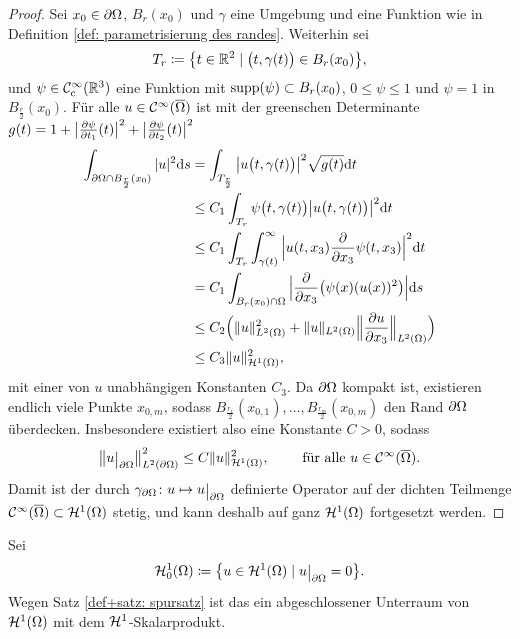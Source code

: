 \begin{proof}
	Sei \(x_0\in\partial\Omega\), \(B_r(x_0)\) und \(\gamma\) eine Umgebung und eine Funktion wie in Definition \ref{def: parametrisierung des randes}. Weiterhin sei
	\begin{equation*}
		T_r\coloneqq\big\{t\in\mathbb{R}^2\mid\big(t,\gamma(t)\big)\in B_r(x_0)\big\},
	\end{equation*}
	und \(\psi\in\mathcal{C}_{\mathrm{c}}^\infty(\mathbb{R}^3)\) eine Funktion mit \(\operatorname{supp}(\psi)\subset B_r(x_0)\), \(0\leq\psi\leq1\) und \(\psi=1\) in \(B_\frac{r}{2}(x_0)\). Für alle \(u\in\mathcal{C}^\infty(\overline{\Omega})\) ist mit der greenschen Determinante \(g(t)=1+\big|\frac{\partial\psi}{\partial t_1}(t)\big|^2+\big|\frac{\partial\psi}{\partial t_2}(t)\big|^2\)
	\begin{align*}
		\int_{\partial\Omega\cap B_\frac{r}{2}(x_0)}|u|^2\mathrm{d}s
		&=\int_{T_\frac{r}{2}}\big|u\big(t,\gamma(t)\big)\big|^2\sqrt{g(t)}\mathrm{d}t\\
		&\leq C_1\int_{T_r}\psi\big(t,\gamma(t)\big)\big|u\big(t,\gamma(t)\big)\big|^2\mathrm{d}t\\
		&\leq C_1\int_{T_r}\int_{\gamma(t)}^\infty\Big|u(t,x_3)\frac{\partial}{\partial x_3}\psi(t,x_3)\Big|^2\mathrm{d}t\\
		&=C_1\int_{B_r(x_0)\cap\Omega}\Big|\frac{\partial}{\partial x_3}\big(\psi(x)(u(x))^2\big)\Big|\mathrm{d}s\\
		&\leq C_2\Big(\|u\|_{L^2(\Omega)}^2+\|u\|_{L^2(\Omega)}\Big\|\frac{\partial u}{\partial x_3}\Big\|_{L^2(\Omega)}\Big)\\
		&\leq C_3\|u\|_{\mathcal{H}^1(\Omega)}^2,
	\end{align*}
	mit einer von \(u\) unabhängigen Konstanten \(C_3\). Da \(\partial\Omega\) kompakt ist, existieren endlich viele Punkte \(x_{0,m}\), sodass \(B_\frac{r_1}{2}(x_{0,1}),\ldots,B_\frac{r_m}{2}(x_{0,m})\) den Rand \(\partial\Omega\) überdecken. Insbesondere existiert also eine Konstante \(C>0\), sodass
	\begin{equation*}
		\big\|u\restrict{\p\Omega}\big\|_{L^2(\p\Omega)}^2\leq C\|u\|_{\H^1(\Omega)}^2,\qquad\te{ für alle }u\in\CC^\infty(\overline{\Omega}).
	\end{equation*}
	Damit ist der durch \(\gamma_{\p\Omega}\colon u\mapsto u\restrict{\p\Omega}\) definierte Operator auf der dichten Teilmenge \(\mathcal{C}^\infty(\overline{\Omega})\subset\mathcal{H}^1(\Omega)\) stetig, und kann deshalb auf ganz \(\mathcal{H}^1(\Omega)\) fortgesetzt werden.
\end{proof}
\begin{definition}
	Sei
	\begin{equation*}
		\H_0^1(\Omega)\coloneqq\big\{u\in\H^1(\Omega)\mid u\restrict{\p\Omega}=0\big\}.
	\end{equation*}
	Wegen Satz \ref{def+satz: spursatz} ist das ein abgeschlossener Unterraum von \(\mathcal{H}^1(\Omega)\) mit dem \(\mathcal{H}^1\)-Skalarprodukt.
\end{definition}
